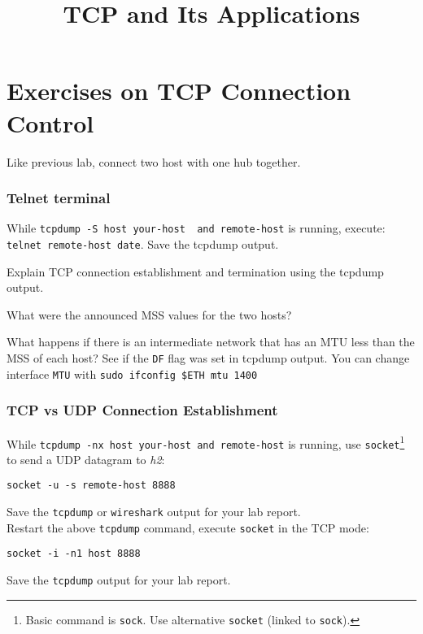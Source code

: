 \documentclass{../UTNetLab}
\title{TCP and Its Applications}
\begin{document}
\part{Exercises on TCP Connection Control}
    Like previous lab, connect two host with one hub together.

\section{Telnet terminal}
    While \lstinline[emph={your-host, remote-host}]{tcpdump -S host your-host  and remote-host} is running, execute: \lstinline[emph={your-host, remote-host}]{telnet remote-host date}.
    Save the tcpdump output.
    
    \begin{report}
    \item Explain TCP connection establishment and termination using the tcpdump output.
    
    \item What were the announced MSS values for the two hosts?
    
    \item What happens if there is an intermediate network that has an MTU less than the MSS of each host?
    See if the \texttt{DF} flag was set in tcpdump output.
    You can change interface \texttt{MTU} with \lstinline{sudo ifconfig $ETH mtu 1400}
    \end{report}
    
\section{TCP vs UDP Connection Establishment}
    While \lstinline[emph={your-host, remote-host}]{tcpdump -nx host your-host and remote-host} is running, use \lstinline{socket}\footnote{Basic command is \lstinline{sock}. Use alternative \lstinline{socket} (linked to \lstinline{sock}).} to send a UDP datagram to \textit{h2}:
    \begin{lstlisting}[emph={your-host, remote-host}]
socket -u -s remote-host 8888
    \end{lstlisting}
    {Save} the \lstinline{tcpdump} or \lstinline{wireshark} output for your lab report. \\
    Restart the above \lstinline{tcpdump} command, execute \lstinline{socket} in the TCP mode:
    \begin{lstlisting}[emph={host}]
socket -i -n1 host 8888
    \end{lstlisting}
    {Save} the \lstinline{tcpdump} output for your lab report.
    
\end{document}
